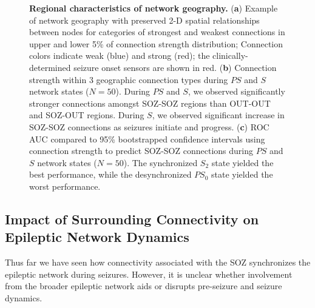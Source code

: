 \begin{figure}[H]
    \caption[Regional characteristics of epileptic network geography]{\textbf{Regional characteristics of network geography.} (\textbf{a}) Example of network geography with preserved 2-D spatial relationships between nodes for categories of strongest and weakest connections in upper and lower 5\% of connection strength distribution; Connection colors indicate weak (blue) and strong (red); the clinically-determined seizure onset sensors are shown in red. (\textbf{b}) Connection strength within 3 geographic connection types during $PS$ and $S$ network states ($N=50$). During $PS$ and $S$, we observed significantly stronger connections amongst SOZ-SOZ regions than OUT-OUT and SOZ-OUT regions. During $S$, we observed significant increase in SOZ-SOZ connections as seizures initiate and progress. (\textbf{c}) ROC AUC compared to 95\% bootstrapped confidence intervals using connection strength to predict SOZ-SOZ connections during $PS$ and $S$ network states ($N=50$). The synchronized $S_2$ state yielded the best performance, while the desynchronized $PS_0$ state yielded the worst performance. \label{ch3:fig5}}
\end{figure}

\subsection{Impact of Surrounding Connectivity on Epileptic Network Dynamics}
Thus far we have seen how connectivity associated with the SOZ synchronizes the epileptic network during seizures. However, it is unclear whether involvement from the broader epileptic network aids or disrupts pre-seizure and seizure dynamics. 

